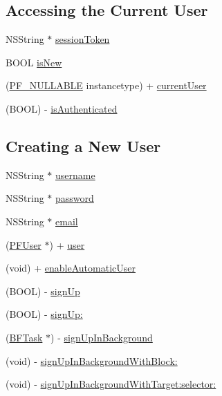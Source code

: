 \subsection*{Accessing the Current User}
\label{_amgrpc0d47885c7774ff5029d0b4cc742ebbe}%


 

 \begin{DoxyCompactItemize}
\item 
N\+S\+String $\ast$ \hyperlink{interface_p_f_user_a1a33bcf3fb85e522f17cca78a800ee71}{session\+Token}
\item 
B\+O\+O\+L \hyperlink{interface_p_f_user_a0397fa3ef6f97f93ad84e6e3a5471fdf}{is\+New}
\item 
(\hyperlink{_p_f_nullability_8h_a528d97a96c5fb279a45c378f5657fca2}{P\+F\+\_\+\+N\+U\+L\+L\+A\+B\+L\+E} instancetype) + \hyperlink{interface_p_f_user_a911666b43df61c07ee5c3c3bdd9c7f96}{current\+User}
\item 
(B\+O\+O\+L) -\/ \hyperlink{interface_p_f_user_af0ccbe228f394d78e88338f7fff555a7}{is\+Authenticated}
\end{DoxyCompactItemize}
\subsection*{Creating a New User}
\label{_amgrp07a25702824e8059019e7a758dc57206}%


 

 \begin{DoxyCompactItemize}
\item 
N\+S\+String $\ast$ \hyperlink{interface_p_f_user_ac17cdae0f1b4c54a3603e035de9a163e}{username}
\item 
N\+S\+String $\ast$ \hyperlink{interface_p_f_user_a58d5692efe283916b59aedd2944f92b8}{password}
\item 
N\+S\+String $\ast$ \hyperlink{interface_p_f_user_aefd63b5a86507b8d70a90aefe00e1bd7}{email}
\item 
(\hyperlink{interface_p_f_user}{P\+F\+User} $\ast$) + \hyperlink{interface_p_f_user_ac6cac6c3fd6fe1d8169b45027ea6ff71}{user}
\item 
(void) + \hyperlink{interface_p_f_user_ad6d2ba2fd12a026f8f8e2a70ed476f57}{enable\+Automatic\+User}
\item 
(B\+O\+O\+L) -\/ \hyperlink{interface_p_f_user_ad3fc4a8b061ecb0ee63bbc2218aceb9e}{sign\+Up}
\item 
(B\+O\+O\+L) -\/ \hyperlink{interface_p_f_user_aa7f131b017ab1443d8ef90c3f3f24dd4}{sign\+Up\+:}
\item 
(\hyperlink{interface_b_f_task}{B\+F\+Task} $\ast$) -\/ \hyperlink{interface_p_f_user_ae6570c7b06cbe8489d882bdf19d502b4}{sign\+Up\+In\+Background}
\item 
(void) -\/ \hyperlink{interface_p_f_user_af5f6a76a95793ee17912568794e3172e}{sign\+Up\+In\+Background\+With\+Block\+:}
\item 
(void) -\/ \hyperlink{interface_p_f_user_ad2d1e680ef46d0038a863af3591cd5f7}{sign\+Up\+In\+Background\+With\+Target\+:selector\+:}
\end{DoxyCompactItemize}
